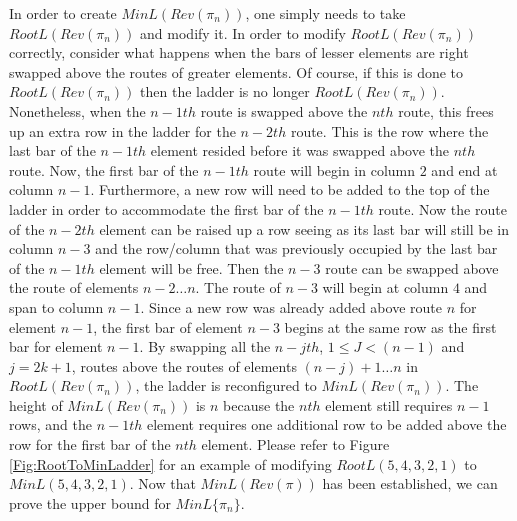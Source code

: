    In order to create $MinL(Rev(\pi_{n}))$, one simply needs to 
   take $RootL(Rev(\pi_{n}))$ and modify it. In order to modify $RootL(Rev(\pi_{n}))$ correctly, consider what happens when 
   the bars of lesser elements are right swapped above the routes of greater elements. Of course, if this is done to $RootL(Rev(\pi_{n}))$ then 
   the ladder is no longer $RootL(Rev(\pi_{n}))$. Nonetheless, when the $n-1th$ route is swapped above the $nth$ route, 
   this frees up an extra row in the ladder for the $n-2th$ route. This is the row where the last bar of the $n-1th$ element resided
   before it was swapped above the $nth$ route. Now, the first bar of the $n-1th$ route will begin in column $2$ and end at column $n-1$. 
   Furthermore, a new row will need to be added to the top of the ladder in order to accommodate the first bar of the $n-1th$ route. Now the route 
   of the $n-2th$ element can be raised up a row seeing as its last bar will still be in column $n-3$ and the row/column 
   that was previously occupied by the last bar of the $n-1th$ element will be free. Then the $n-3$ route can be swapped above 
   the route of elements $n-2 \dots n$. The route of $n-3$ will begin at column $4$ and span to column $n-1$. 
   Since a new row was already added above route $n$ for element $n-1$, 
   the first bar of element $n-3$ begins at the 
   same row as the first bar for element $n-1$. By swapping 
   all the $n-jth$, $1 \leq J < (n-1)$ and $j=2k+1$, routes above the routes of elements 
   $(n-j)+1 \dots n$ in $RootL(Rev(\pi_{n}))$, the ladder is reconfigured to $MinL(Rev(\pi_{n}))$. The height of $MinL(Rev(\pi_{n}))$ is $n$ 
   because the $nth$ element still requires $n-1$ rows, and the $n-1th$ element requires one additional row to be added above 
   the row for the first bar of the $nth$ element. Please refer 
   to Figure \ref{Fig:RootToMinLadder} for an example of modifying $RootL(5,4,3,2,1)$ to $MinL(5,4,3,2,1)$.
   Now that $MinL(Rev(\pi))$ has been established, we can prove the upper bound for
   $MinL\{\pi_{n}\}$.  

